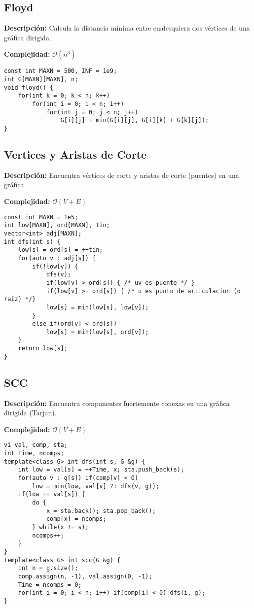 \documentclass[twocolumn]{article}
\begin{document}
\subsection{Floyd}
\begin{footnotesize}{\bf Descripción:} Calcula la distancia mínima entre cualesquiera dos vértices de una gráfica dirigida.


{\bf Complejidad:} $\mathcal{O}(n^3)$
\end{footnotesize}\lstset{basicstyle=\footnotesize\ttfamily,breaklines=true,tabsize=2,language=C++,frame=leftline, numbers=left, numberstyle=\tiny, numbersep=5pt}
\begin{lstlisting}
const int MAXN = 500, INF = 1e9;
int G[MAXN][MAXN], n;
void floyd() {
	for(int k = 0; k < n; k++)
		for(int i = 0; i < n; i++)
			for(int j = 0; j < n; j++)
				G[i][j] = min(G[i][j], G[i][k] + G[k][j]);
}
\end{lstlisting}
\subsection{Vertices y Aristas de Corte}
\begin{footnotesize}{\bf Descripción: } Encuentra vértices de corte y aristas de corte (puentes) en una gráfica.


{\bf Complejidad: } $\mathcal{O}(V + E)$
\end{footnotesize}\lstset{basicstyle=\footnotesize\ttfamily,breaklines=true,tabsize=2,language=C++,frame=leftline, numbers=left, numberstyle=\tiny, numbersep=5pt}
\begin{lstlisting}
const int MAXN = 1e5;
int low[MAXN], ord[MAXN], tin;
vector<int> adj[MAXN];
int dfs(int s) {
	low[s] = ord[s] = ++tin;
	for(auto v : adj[s]) {
		if(!low[v]) {
			dfs(v);
			if(low[v] > ord[s]) { /* uv es puente */ }
			if(low[v] >= ord[s]) { /* u es punto de articulacion (o raiz) */}
			low[s] = min(low[s], low[v]);
		}
		else if(ord[v] < ord[s])
			low[s] = min(low[s], ord[v]);
	}
	return low[s];
}
\end{lstlisting}
\subsection{SCC}
\begin{footnotesize}{\bf Descripción: } Encuentra componentes fuertemente conexas en una gráfica dirigida (Tarjan).


{\bf Complejidad: } $\mathcal{O}(V + E)$
\end{footnotesize}\lstset{basicstyle=\footnotesize\ttfamily,breaklines=true,tabsize=2,language=C++,frame=leftline, numbers=left, numberstyle=\tiny, numbersep=5pt}
\begin{lstlisting}
vi val, comp, sta;
int Time, ncomps;
template<class G> int dfs(int s, G &g) {
	int low = val[s] = ++Time, x; sta.push_back(s);
	for(auto v : g[s]) if(comp[v] < 0)
		low = min(low, val[v] ?: dfs(v, g));
	if(low == val[s]) {
		do {
			x = sta.back(); sta.pop_back();
			comp[x] = ncomps;
		} while(x != s);
		ncomps++;
	}
}
template<class G> int scc(G &g) {
	int n = g.size();
	comp.assign(n, -1), val.assign(0, -1);
	Time = ncomps = 0;
	for(int i = 0; i < n; i++) if(comp[i] < 0) dfs(i, g);
}
\end{lstlisting}
\end{document}
